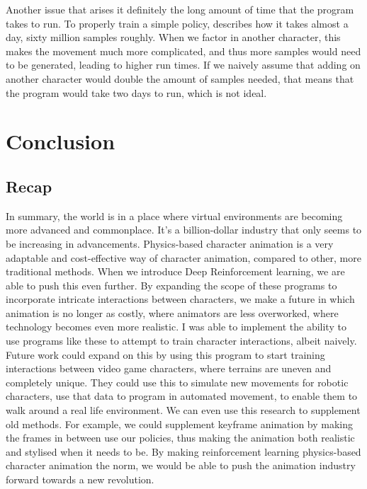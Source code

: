 \documentclass{l4proj}
\begin{document}
Another issue that arises it definitely the long amount of time that the program takes to run. To properly train a simple policy, \cite{deepmimic} describes how it takes almost a day, sixty million samples roughly. When we factor in another character, this makes the movement much more complicated, and thus more samples would need to be generated, leading to higher run times. If we naively assume that adding on another character would double the amount of samples needed, that means that the program would take two days to run, which is not ideal.

\chapter{Conclusion}    

\section{Recap}
In summary, the world is in a place where virtual environments are becoming more advanced and commonplace. It's a billion-dollar industry that only seems to be increasing in advancements. Physics-based character animation is a very adaptable and cost-effective way of character animation, compared to other, more traditional methods. When we introduce Deep Reinforcement learning, we are able to push this even further. By expanding the scope of these programs to incorporate intricate interactions between characters, we make a future in which animation is no longer as costly, where animators are less overworked, where technology becomes even more realistic. I was able to implement the ability to use programs like these to attempt to train character interactions, albeit naively. Future work could expand on this by using this program to start training interactions between video game characters, where terrains are uneven and completely unique. They could use this to simulate new movements for robotic characters, use that data to program in automated movement, to enable them to walk around a real life environment. We can even use this research to supplement old methods. For example, we could supplement keyframe animation by making the frames in between use our policies, thus making the animation both realistic and stylised when it needs to be. By making reinforcement learning physics-based character animation the norm, we would be able to push the animation industry forward towards a new revolution.
\end{document}
